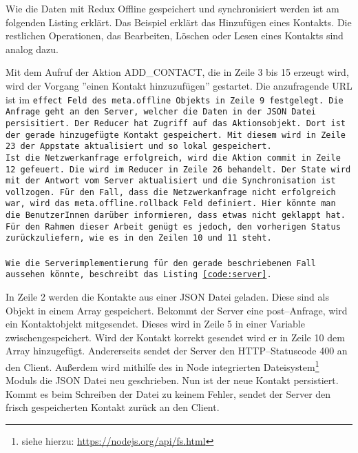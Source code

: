 Wie die Daten mit Redux Offline gespeichert und synchronisiert werden ist am folgenden Listing erklärt.
Das Beispiel erklärt das Hinzufügen eines Kontakts. Die restlichen Operationen, das Bearbeiten, Löschen oder Lesen eines Kontakts sind analog dazu. 
\begin{center}  
\end{center}
%
Mit dem Aufruf der Aktion ADD\_CONTACT, die in Zeile 3 bis 15 erzeugt wird, wird der Vorgang ''einen Kontakt hinzuzufügen'' gestartet.
Die anzufragende URL ist im \tt{effect} Feld des \tt{meta.offline} Objekts in Zeile 9 festgelegt. Die Anfrage geht an den Server, welcher die Daten in der \gls{JSON} Datei persisitiert.
Der Reducer hat Zugriff auf das Aktionsobjekt. Dort ist der gerade hinzugefügte Kontakt gespeichert. Mit diesem wird in Zeile 23 der Appstate aktualisiert und so lokal gespeichert.\\
Ist die Netzwerkanfrage erfolgreich, wird die Aktion \tt{commit} in Zeile 12 gefeuert.
Die wird im Reducer in Zeile 26 behandelt. Der State wird mit der Antwort vom Server aktualisiert und die Synchronisation ist vollzogen.
Für den Fall, dass die Netzwerkanfrage nicht erfolgreich war, wird das \tt{meta.offline.rollback} Feld definiert.
Hier könnte man die BenutzerInnen darüber informieren, dass etwas nicht geklappt hat.
Für den Rahmen dieser Arbeit genügt es jedoch, den vorherigen Status zurückzuliefern, wie es in den Zeilen 10 und 11 steht.\\\\
Wie die Serverimplementierung für den gerade beschriebenen Fall aussehen könnte, beschreibt das Listing \ref{code:server}.
%
\begin{center}  
\end{center}
%
In Zeile 2 werden die Kontakte aus einer \gls{JSON} Datei geladen. Diese sind als Objekt in einem Array gespeichert.
Bekommt der Server eine post--Anfrage, wird ein Kontaktobjekt mitgesendet. Dieses wird in Zeile 5 in einer Variable zwischengespeichert. 
Wird der Kontakt korrekt gesendet wird er in Zeile 10 dem Array hinzugefügt.
Andererseits sendet der Server den \gls{HTTP}--Statuscode 400 an den Client. %
Außerdem wird mithilfe des in Node integrierten Dateisystem\footnote{siehe hierzu: \url{https://nodejs.org/api/fs.html}} Moduls die \gls{JSON} Datei neu geschrieben.
Nun ist der neue Kontakt persistiert. Kommt es beim Schreiben der Datei zu keinem Fehler, sendet der Server den frisch gespeicherten Kontakt zurück an den Client.